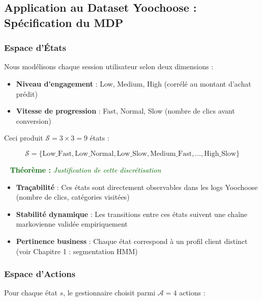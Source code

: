 \documentclass[11pt,a4paper]{article}
\newenvironment{thmbox}[1]{%
  \vspace{3pt}\begin{framed}
  \noindent{\color{DarkGreen}\rule{0.3cm}{3pt}}~%
  \textcolor{DarkGreen}{\textbf{Théorème :} \textit{#1}}\\[3pt]}
  {\end{framed}\vspace{3pt}}
\begin{document}
\subsection{Application au Dataset Yoochoose : Spécification du MDP}

\subsubsection{Espace d'États}

Nous modélisons chaque session utilisateur selon deux dimensions :
\begin{itemize}
  \item \textbf{Niveau d'engagement} : Low, Medium, High (corrélé au montant d'achat prédit)
  \item \textbf{Vitesse de progression} : Fast, Normal, Slow (nombre de clics avant conversion)
\end{itemize}

Ceci produit $\mathcal{S} = 3 \times 3 = 9$ états :

$$\mathcal{S} = \{\text{Low\_Fast}, \text{Low\_Normal}, \text{Low\_Slow}, \text{Medium\_Fast}, \ldots, \text{High\_Slow}\}$$

\begin{thmbox}{Justification de cette discrétisation}
\begin{itemize}
  \item \textbf{Traçabilité} : Ces états sont directement observables dans les logs Yoochoose (nombre de clics, catégories visitées)
  \item \textbf{Stabilité dynamique} : Les transitions entre ces états suivent une chaîne markovienne validée empiriquement
  \item \textbf{Pertinence business} : Chaque état correspond à un profil client distinct (voir Chapitre 1 : segmentation HMM)
\end{itemize}
\end{thmbox}

\subsubsection{Espace d'Actions}

Pour chaque état $s$, le gestionnaire choisit parmi $\mathcal{A} = 4$ actions :
\end{document}

